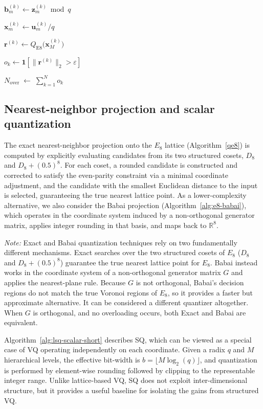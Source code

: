 \documentclass{article}
\theoremstyle{definition}
\theoremstyle{remark}
\begin{document}
\begin{algorithm}[]
{{    $\mathbf{b}^{(k)}_m \gets \mathbf{z}^{(k)}_m \bmod q$ 
    
    $\mathbf{x}^{(k)}_m \gets \mathbf{u}^{(k)}_m / q$ 
  }
  
  $\mathbf{r}^{(k)} \gets Q_{\mathrm{E8}}\bigl(\mathbf{x}^{(k)}_M\bigr)$ 
  
  $
    o_k \gets
    \mathbf{1}\!\left[
      \bigl\|\mathbf{r}^{(k)}\bigr\|_2 > \varepsilon
    \right]
  $   
}

$N_{\mathrm{over}} \;\gets\; \sum_{k=1}^{N} o_k$ 
\end{algorithm}
\subsection{Nearest-neighbor projection and scalar quantization}
The exact nearest-neighbor projection onto the $E_8$ lattice (Algorithm~\ref{qe8}) is computed by explicitly evaluating candidates from its two structured cosets, $D_8$ and $D_8+(0.5)^8$. For each coset, a rounded candidate is constructed and corrected to satisfy the even-parity constraint via a minimal coordinate adjustment, and the candidate with the smallest Euclidean distance to the input is selected, guaranteeing the true nearest lattice point. 
As a lower-complexity alternative, we also consider the Babai projection (Algorithm~\ref{alg:e8-babai}), which operates in the coordinate system induced by a non-orthogonal generator matrix, applies integer rounding in that basis, and maps back to $\mathbb{R}^8$. 

\textit{Note:} Exact and Babai quantization techniques rely on two fundamentally different mechanisms.
Exact searches over the two structured cosets of $E_8$ ($D_8$ and $D_8 + (0.5)^8$) guarantee the true nearest lattice point for $E_8$. Babai instead works in the coordinate system of a non-orthogonal generator matrix $G$ and applies the nearest-plane rule. Because $G$ is not orthogonal, Babai’s decision regions do not match the true Voronoi regions of $E_8$, so it provides a faster but approximate alternative. It can be considered a different quantizer altogether. When $G$ is orthogonal, and no overloading occurs, both Exact and Babai are equivalent.


Algorithm~\ref{alg:lsq-scalar-short} describes SQ, which can be viewed as a special case of VQ operating independently on each coordinate. Given a radix $q$ and $M$ hierarchical levels, the effective bit-width is $b=\lfloor M\log_2(q)\rfloor$, and quantization is performed by element-wise rounding followed by clipping to the representable integer range. Unlike lattice-based VQ, SQ does not exploit inter-dimensional structure, but it provides a useful baseline for isolating the gains from structured VQ.
\end{document}
